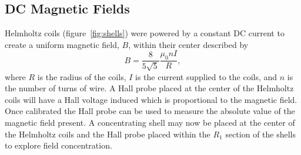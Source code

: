 \documentclass[11pt]{iopart}
\begin{document}
\subsection{DC Magnetic Fields}
Helmholtz coils (figure~\ref{fig:shells}) were powered by a constant
DC current to create a uniform magnetic field, $B$, within their
center described by
\begin{equation}
  B = \frac{8}{5\sqrt{5}}\frac{\mu_0 nI}{R},
  \label{eqn:helm}
\end{equation}
where $R$ is the radius of the coils, $I$ is the current supplied to
the coils, and $n$ is the number of turns of wire.  A Hall probe
placed at the center of the Helmholtz coils will have a Hall voltage
induced which is proportional to the magnetic field. Once calibrated
the Hall probe can be used to measure the absolute value of the
magnetic field present. A concentrating shell may now be placed 
at the center of the Helmholtz coils and the Hall probe placed within
the $R_1$ section of the shells to explore field concentration.



\end{document}
